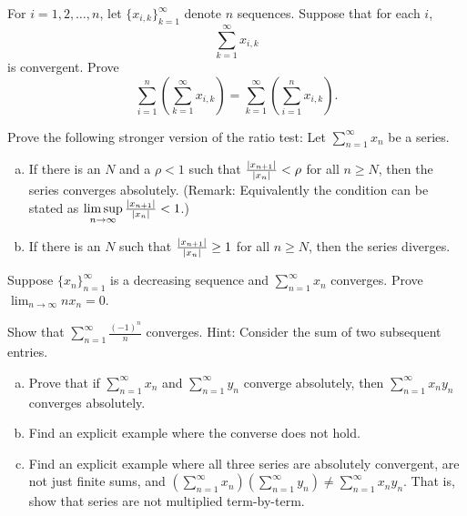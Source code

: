 \begin{exercise}
For $i=1,2,\ldots,n$, let $\{ x_{i,k} \}_{k=1}^\infty$ denote $n$
sequences.  Suppose that for each $i$,
\begin{equation*}
\sum_{k=1}^\infty x_{i,k}
\end{equation*}
is convergent.  Prove
\begin{equation*}
\sum_{i=1}^n \left( \sum_{k=1}^\infty x_{i,k} \right)
=
\sum_{k=1}^\infty \left( \sum_{i=1}^n x_{i,k} \right) .
\end{equation*}
\end{exercise}

\begin{exercise} \label{exercise:strongerratiotest}
Prove the following stronger version of the ratio test:
Let $\sum_{n=1}^\infty x_n$ be a series.
\begin{enumerate}[a)]
\item
If there is an $N$ and a $\rho < 1$ such that
$\frac{\lvert {x_{n+1}} \rvert}{\lvert {x_n} \rvert} < \rho$ for all $n \geq N$,
then the series converges absolutely.
(Remark: Equivalently the condition can be stated as
$\limsup\limits_{n\to\infty} \frac{\lvert {x_{n+1}} \rvert}{\lvert {x_n} \rvert} < 1$.)
\item
If there is an $N$ such that
$\frac{\lvert {x_{n+1}} \rvert}{\lvert {x_n} \rvert} \geq 1$
for all $n \geq N$,
then the series diverges. 
\end{enumerate}
\end{exercise}

\begin{exercise}[Challenging]
Suppose $\{ x_n \}_{n=1}^\infty$ is a decreasing sequence and
$\sum_{n=1}^\infty x_n$ converges.
Prove $\displaystyle \lim_{n\to\infty} n x_n = 0$.
\end{exercise}

\begin{exercise}
Show that $\displaystyle \sum_{n=1}^\infty \frac{{(-1)}^n}{n}$ converges.
Hint: Consider the sum of two subsequent entries.
\end{exercise}

\begin{exercise}
\leavevmode
\begin{enumerate}[a)]
\item Prove that if $\sum_{n=1}^\infty x_n$ and $\sum_{n=1}^\infty y_n$ converge absolutely, then
$\sum_{n=1}^\infty x_ny_n$ converges absolutely.
\item Find an explicit example where the converse does not hold.
\item Find an explicit example where all three series are absolutely convergent,
are not just finite sums,
and $\left(\sum_{n=1}^\infty x_n\right)\left(\sum_{n=1}^\infty y_n\right)
\neq \sum_{n=1}^\infty x_ny_n$.  That is, show that series are
not multiplied term-by-term.
\end{enumerate}
\end{exercise}

